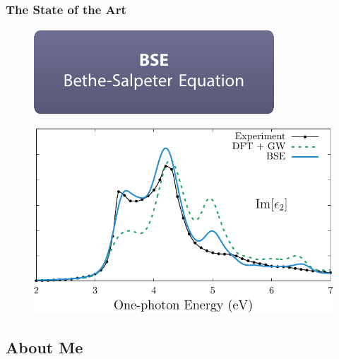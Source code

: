 \documentclass{beamer}
\begin{document}
\begin{frame}
\frametitle{The State of the Art}
\begin{figure}
\centering
\includegraphics[height=0.2\textheight]{diag-methods_future}
\end{figure}
\begin{figure}
\centering
\includegraphics[height=0.55\textheight]{fig-mbpt03}
\end{figure}
\end{frame}



\subsection{About Me}
\end{document}
